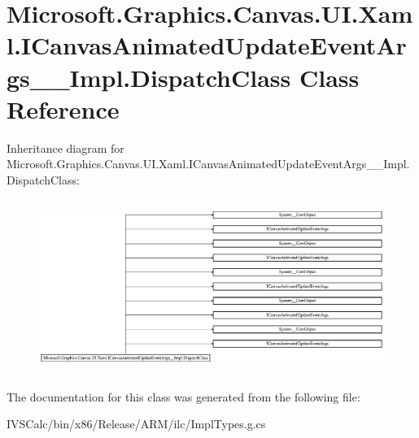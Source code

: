 \hypertarget{class_microsoft_1_1_graphics_1_1_canvas_1_1_u_i_1_1_xaml_1_1_i_canvas_animated_update_event_args_____impl_1_1_dispatch_class}{}\section{Microsoft.\+Graphics.\+Canvas.\+U\+I.\+Xaml.\+I\+Canvas\+Animated\+Update\+Event\+Args\+\_\+\+\_\+\+Impl.\+Dispatch\+Class Class Reference}
\label{class_microsoft_1_1_graphics_1_1_canvas_1_1_u_i_1_1_xaml_1_1_i_canvas_animated_update_event_args_____impl_1_1_dispatch_class}
Inheritance diagram for Microsoft.\+Graphics.\+Canvas.\+U\+I.\+Xaml.\+I\+Canvas\+Animated\+Update\+Event\+Args\+\_\+\+\_\+\+Impl.\+Dispatch\+Class\+:\begin{figure}[H]
\begin{center}
\leavevmode
\includegraphics[height=5.682656cm]{class_microsoft_1_1_graphics_1_1_canvas_1_1_u_i_1_1_xaml_1_1_i_canvas_animated_update_event_args_____impl_1_1_dispatch_class}
\end{center}
\end{figure}


The documentation for this class was generated from the following file\+:\begin{DoxyCompactItemize}
\item 
I\+V\+S\+Calc/bin/x86/\+Release/\+A\+R\+M/ilc/Impl\+Types.\+g.\+cs\end{DoxyCompactItemize}
